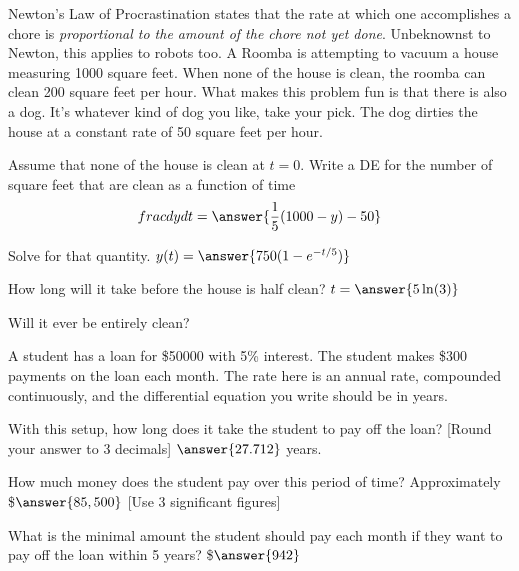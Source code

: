 \documentclass{ximera}
\begin{document}
\begin{exercise}
    Newton's Law of Procrastination states that the rate at which one accomplishes a chore is {\it proportional to the amount of the chore not yet done}. Unbeknownst to Newton, this applies to robots too. A Roomba is attempting to vacuum a house measuring 1000 square feet. When none of the house is clean, the roomba can clean 200 square feet per hour. What makes this problem fun is that there is also a dog. It's whatever kind of dog you like, take your pick. The dog dirties the house at a constant rate of 50 square feet per hour.
    
    Assume that none of the house is clean at $t=0$. Write a DE for the number of square feet that are clean as a function of time
    \[
        frac{dy}{dt} = \answer{\frac{1}{5}(1000 - y) - 50}
    \]
    \begin{problem}
        Solve for that quantity. $y(t) = \answer{750(1-e^{-t/5})}$
        \begin{problem}
            How long will it take before the house is half clean? $t = \answer{5\ln(3)}$
            \begin{problem}
                Will it ever be entirely clean?
                \begin{multipleChoice}
                \end{multipleChoice}
            \end{problem}
        \end{problem}
    \end{problem}
\end{exercise}

\begin{exercise}
    A student has a loan for \$50000 with 5\% interest. The student makes \$300 payments on the loan each month. The rate here is an annual rate, compounded continuously, and the differential equation you write should be in years.
    
    With this setup, how long does it take the student to pay off the loan? [Round your answer to 3 decimals] $\answer{27.712}$ years.
    \begin{problem}
        How much money does the student pay over this period of time?  Approximately \$$\answer{85,500}$ [Use 3 significant figures]
        \begin{problem}
            What is the minimal amount the student should pay each month if they want to pay off the loan within 5 years? \$$\answer{942}$
        \end{problem}
    \end{problem}
\end{exercise}
\end{document}
